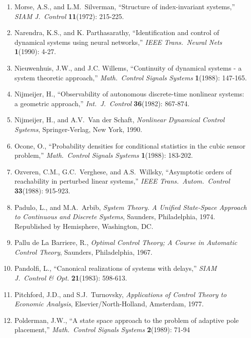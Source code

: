 \begin{enumerate}
\item
Morse, A.S., and L.M.\ Silverman, ``Structure of index-invariant systems,''
{\it SIAM J.\ Control} {\bf 11}(1972): 215-225.

\item
Narendra, K.S., and K. Parthasarathy, ``Identification and control of
dynamical systems using neural networks,'' {\it IEEE Trans.\ Neural Nets} {\bf
1}(1990): 4-27.

\item
Nieuwenhuis, J.W., and J.C. Willems, ``Continuity of dynamical systems - a
system theoretic approach,'' {\it Math.\ Control Signals Systems} {\bf
1}(1988): 147-165.

\item
Nijmeijer, H., ``Observability of autonomous discrete-time nonlinear systems:
a geometric approach,'' {\it Int.\ J.\ Control} {\bf 36}(1982): 867-874.

\item
Nijmeijer, H., and A.V.\ Van der Schaft, {\it Nonlinear Dynamical Control
Systems}, Springer-Verlag, New York, 1990.

\item
Ocone, O., ``Probability densities for conditional statistics in the cubic
sensor problem,'' {\it Math.\ Control Signals Systems} {\bf 1}(1988): 183-202.

\item
Ozveren, C.M., G.C.\ Verghese, and A.S.\ Willsky, ``Asymptotic orders of
reachability in perturbed linear systems,'' {\it IEEE Trans.\ Autom.\ Control}
{\bf 33}(1988): 915-923.

\item
Padulo, L., and M.A.\ Arbib, {\it System Theory.  A Unified State-Space
Approach to Continuous and Discrete Systems}, Saunders, Philadelphia, 1974.
Republished by Hemisphere, Washington, DC.

\item
Pallu de La Barriere, R., {\it Optimal Control Theory; A Course in Automatic
Control Theory}, Saunders, Philadelphia, 1967.

\item
Pandolfi, L., ``Canonical realizations of systems with delays,'' {\it SIAM J.\
Control \& Opt.} {\bf 21}(1983): 598-613.

\item
Pitchford, J.D., and S.J.\ Turnovsky, {\it Applications of Control Theory to
Economic Analysis}, Elsevier/North-Holland, Amsterdam, 1977.

\item
Polderman, J.W., ``A state space approach to the problem of adaptive pole
placement,'' {\it Math.\ Control Signals Systems} {\bf 2}(1989): 71-94


\end{enumerate}
